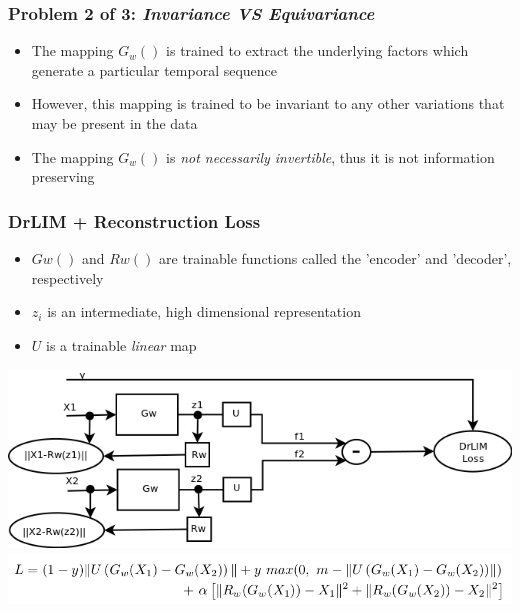 \documentclass{beamer}
\begin{document}
\begin{frame} 
\frametitle{Problem 2 of 3: \emph{Invariance VS Equivariance}}
\begin{itemize}
\item The mapping $G_w()$ is trained to extract the underlying factors which generate a particular temporal sequence 
\item However, this mapping is trained to be invariant to any other variations that may be present in the data     
\item The mapping $G_w()$ is \emph{not necessarily invertible}, thus it is not information preserving 
\end{itemize} 
\end{frame} 

\begin{frame}
\frametitle{DrLIM + Reconstruction Loss} 
\begin{center} 
\begin{itemize}
\item $Gw()$ and $Rw()$ are trainable functions called the 'encoder' and 'decoder', respectively
\item $z_i$ is an intermediate, high dimensional representation 
\item $U$ is a trainable \emph{linear} map
\end{itemize}
\includegraphics[scale = 0.4]{./figures/redrlim_diag.png} 
\vspace{0.7cm}
\includegraphics[scale = 0.3]{./figures/redrlim_loss.png} 
\end{center} 
\end{frame} 
\end{document}
